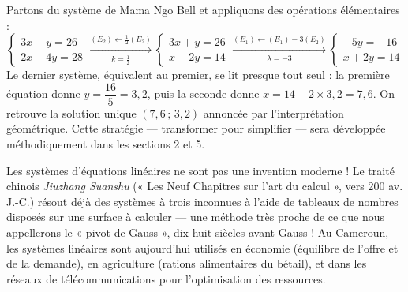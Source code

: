 \documentclass[11pt]{article}
\begin{document}
\begin{exemplebox}
Partons du système de Mama Ngo Bell et appliquons des opérations élémentaires :
\[
\begin{cases} 3x + y = 26 \\ 2x + 4y = 28 \end{cases}
\xrightarrow[\;k=\tfrac12\;]{(E_2) \leftarrow \frac{1}{2}(E_2)}
\begin{cases} 3x + y = 26 \\ x + 2y = 14 \end{cases}
\xrightarrow[\;\lambda=-3\;]{(E_1) \leftarrow (E_1) - 3(E_2)}
\begin{cases} -5y = -16 \\ x + 2y = 14 \end{cases}
\]
Le dernier système, équivalent au premier, se lit presque tout seul : la première équation donne $y = \dfrac{16}{5} = 3{,}2$, puis la seconde donne $x = 14 - 2 \times 3{,}2 = 7{,}6$. On retrouve la solution unique $(7{,}6\,;\,3{,}2)$ annoncée par l'interprétation géométrique. Cette stratégie — transformer pour simplifier — sera développée méthodiquement dans les sections 2 et 5.
\end{exemplebox}

\begin{savaistu}
Les systèmes d'équations linéaires ne sont pas une invention moderne ! Le traité chinois \emph{Jiuzhang Suanshu} (« Les Neuf Chapitres sur l'art du calcul », vers 200 av. J.-C.) résout déjà des systèmes à trois inconnues à l'aide de tableaux de nombres disposés sur une surface à calculer — une méthode très proche de ce que nous appellerons le « pivot de Gauss », dix-huit siècles avant Gauss ! Au Cameroun, les systèmes linéaires sont aujourd'hui utilisés en économie (équilibre de l'offre et de la demande), en agriculture (rations alimentaires du bétail), et dans les réseaux de télécommunications pour l'optimisation des ressources.
\end{savaistu}
\end{document}
